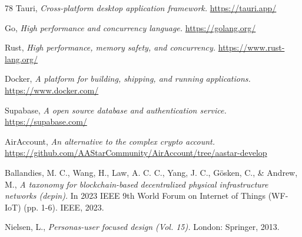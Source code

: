 \documentclass[preprint,12pt]{elsarticle}
\begin{document}
\begin{thebibliography}{78}
Tauri,
\textit{Cross-platform desktop application framework.}
\url{https://tauri.app/}

Go,
\textit{High performance and concurrency language.}
\url{https://golang.org/}

Rust,
\textit{High performance, memory safety, and concurrency.}
\url{https://www.rust-lang.org/}

Docker,
\textit{A platform for building, shipping, and running applications.}
\url{https://www.docker.com/}

Supabase,
\textit{A open source database and authentication service.}
\url{https://supabase.com/}

AirAccount,
\textit{An alternative to the complex crypto account.}
\url{https://github.com/AAStarCommunity/AirAccount/tree/aastar-develop}

Ballandies, M. C., Wang, H., Law, A. C. C., Yang, J. C., Gösken, C., \& Andrew, M.,
\textit{A taxonomy for blockchain-based decentralized physical infrastructure networks (depin).}
In 2023 IEEE 9th World Forum on Internet of Things (WF-IoT) (pp. 1-6). IEEE, 2023.

Nielsen, L.,
\textit{Personas-user focused design (Vol. 15).} London: Springer, 2013.


\end{thebibliography}
\end{document}
